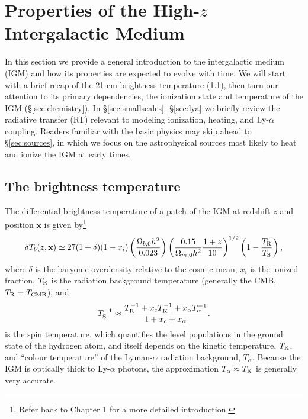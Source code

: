 \section{Properties of the High-$z$ Intergalactic Medium} \label{sec:igm}
In this section we provide a general introduction to the intergalactic medium (IGM) and how its properties are expected to evolve with time. We will start with a brief recap of the 21-cm brightness temperature (\ref{sec:dTb}), then turn our attention to its primary dependencies, the ionization state and temperature of the IGM (\S\ref{sec:chemistry}). In \S\ref{sec:smallscales}- \S\ref{sec:lya} we briefly review the radiative transfer (RT) relevant to modeling ionization, heating, and $\text{Ly-}\alpha$ coupling. Readers familiar with the basic physics may skip ahead to \S\ref{sec:sources}, in which we focus on the astrophysical sources most likely to heat and ionize the IGM at early times.

\subsection{The brightness temperature} \label{sec:dTb}
The differential brightness temperature of a patch of the IGM at redshift $z$ and position $\mathbf{x}$ is given by\footnote{Refer back to Chapter 1 for a more detailed introduction.} 
\begin{equation}
    \delta T_b(z, \mathbf{x}) \simeq 27 (1 + \delta) (1 - x_i) \left(\frac{\Omega_{b,0} h^2}{0.023} \right) \left(\frac{0.15}{\Omega_{m,0} h^2} \frac{1 + z}{10} \right)^{1/2} \left(1 - \frac{T_{\text{R}}}{T_{\text{S}}} \right) , \label{eq:dTb}
\end{equation}
where $\delta$ is the baryonic overdensity relative to the cosmic mean, $x_i$ is the ionized fraction, $T_{\text{R}}$ is the radiation background temperature (generally the CMB, $T_{\text{R}} = T_{\text{CMB}}$), and
\begin{equation}
    T_{\text{S}}^{-1} \approx \frac{T_{\text{R}}^{-1} + x_c T_{\text{K}}^{-1} + x_{\alpha} T_{\alpha}^{-1}}{1 + x_c + x_{\alpha}} . \label{eq:Ts}
\end{equation}
is the spin temperature, which quantifies the level populations in the ground state of the hydrogen atom, and itself depends on the kinetic temperature, $T_{\text{K}}$, and ``colour temperature'' of the Lyman-$\alpha$ radiation background, $T_{\alpha}$. Because the IGM is optically thick to Ly-$\alpha$ photons, the approximation $T_{\alpha} \approx T_{\text{K}}$ is generally very accurate.

